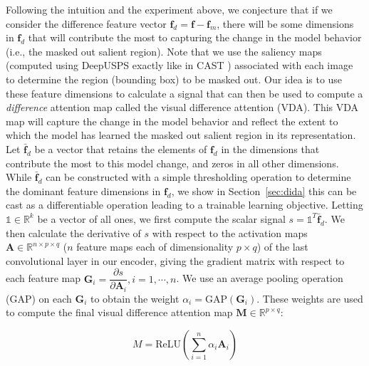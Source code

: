 \documentclass[10pt,twocolumn,letterpaper]{article}
\begin{document}
Following the intuition and the experiment above, we conjecture that if we consider the difference feature vector $\textbf{f}_{d}=\textbf{f}-\textbf{f}_{m}$, there will be some dimensions in $\textbf{f}_{d}$ that will contribute the most to capturing the change in the model behavior (i.e., the masked out salient region). Note that we use the saliency maps (computed using DeepUSPS \cite{nguyen2019deepusps} exactly like in CAST \cite{selvaraju2021casting}) associated with each image to determine the region (bounding box) to be masked out. Our idea is to use these feature dimensions to calculate a signal that can then be used to compute a \textsl{difference} attention map called the visual difference attention (VDA). This VDA map will capture the change in the model behavior and reflect the extent to which the model has learned the masked out salient region in its representation. Let $\bar{\textbf{f}}_{d}$ be a vector that retains the elements of $\textbf{f}_{d}$ in the dimensions that contribute the most to this model change, and zeros in all other dimensions. While $\bar{\textbf{f}}_{d}$ can be constructed with
a simple thresholding operation to determine the dominant feature dimensions in $\textbf{f}_{d}$, we show in Section~\ref{sec:dida} this can be cast as a differentiable operation leading to a trainable learning objective. Letting $\mathbb{1} \in \mathbb{R}^{k}$ be a vector of all ones, we first compute the scalar signal $s=\mathbb{1}^{T}\bar{\textbf{f}}_{d}$. We then calculate the derivative of $s$ with respect to the activation maps $\textbf{A} \in \mathbb{R}^{n \times p\times q}$ ($n$ feature maps each of dimensionality $p\times q$) of the last convolutional layer in our encoder, giving the gradient matrix with respect to each feature map $\textbf{G}_i = \dfrac{\partial s}{\partial \textbf{A}_i}, i=1, \cdots, n$. We use an average pooling operation (GAP) on each $\textbf{G}_i$ to obtain the weight $\alpha_i = \text{GAP}(\textbf{G}_i)$. These weights are used to compute the final visual difference attention map $\textbf{M} \in \mathbb{R}^{p\times q}$:

\begin{equation}
    M=\text{ReLU}(\sum_{i=1}^{n}\alpha_i\textbf{A}_i)
    \label{eq:vda}
\end{equation}
\end{document}
